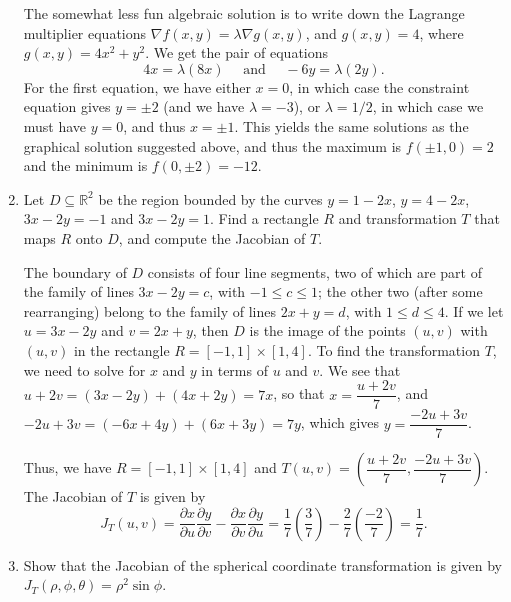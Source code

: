 \documentclass[12pt]{article}
\newcommand{\points}[1]{\marginpar{\hspace{24pt}[#1]}}
\begin{document}
\begin{enumerate}
\medskip

The somewhat less fun algebraic solution is to write down the Lagrange multiplier equations $\nabla f(x,y) = \lambda \nabla g(x,y)$, and $g(x,y)=4$, where $g(x,y) = 4x^2+y^2$. We get the pair of equations
\[
 4x = \lambda (8x) \quad \text{ and } \quad -6y = \lambda(2y).
\]
For the first equation, we have either $x=0$, in which case the constraint equation gives $y=\pm 2$ (and we have $\lambda = -3$), or $\lambda =1/2$, in which case we must have $y=0$, and thus $x=\pm 1$. This yields the same solutions as the graphical solution suggested above, and thus the  maximum is $f(\pm 1,0)=2$ and the minimum is $f(0, \pm 2) = -12$.

\bigskip

\newpage

\item Let $D\subseteq \mathbb{R}^2$ be the region bounded by the curves $y=1-2x$, $y=4-2x$, $3x-2y=-1$ and $ 3x-2y=1$. Find a rectangle $R$ and transformation $T$ that maps $R$ onto $D$, and compute the Jacobian of $T$.  \points{6}

\bigskip

The boundary of $D$ consists of four line segments, two of which are part of the family of lines $3x-2y=c$, with $-1\leq c\leq 1$; the other two (after some rearranging) belong to the family of lines $2x+y=d$, with $1\leq d\leq 4$. If we let $u=3x-2y$ and $v=2x+y$, then $D$ is the image of the points $(u,v)$ with $(u,v)$ in the rectangle $R = [-1,1]\times [1,4]$. To find the transformation $T$, we need to solve for $x$ and $y$ in terms of $u$ and $v$. We see that $u+2v = (3x-2y)+(4x+2y) = 7x$, so that $x = \dfrac{u+2v}{7}$, and $-2u+3v = (-6x+4y)+(6x+3y) = 7y$, which gives $y= \dfrac{-2u+3v}{7}$.

Thus, we have $R=[-1,1]\times [1,4]$ and $T(u,v) = \left(\dfrac{u+2v}{7},\dfrac{-2u+3v}{7}\right)$. The Jacobian of $T$ is given by
\[
 J_T(u,v) = \frac{\partial x}{\partial u}\frac{\partial y}{\partial v}-\frac{\partial x}{\partial v}\frac{\partial y}{\partial u} = \frac{1}{7}\left(\frac{3}{7}\right)-\frac{2}{7}\left(\frac{-2}{7}\right) = \frac{1}{7}.
\]


\item Show that the Jacobian of the spherical coordinate transformation is given by $J_T(\rho,\phi,\theta) = \rho^2\sin\phi$.\points{4}


\bigskip


\end{enumerate}
\end{document}
